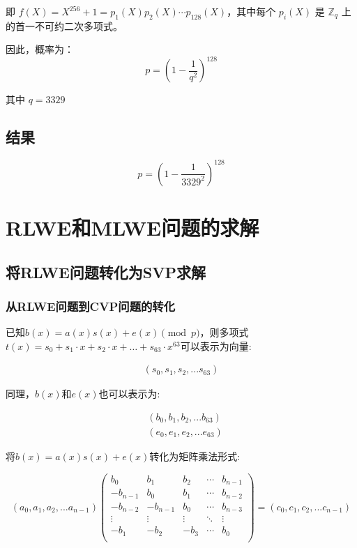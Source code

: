 \documentclass[12pt,a4paper]{article}
\numberwithin{equation}{section}
\begin{document}
即 $f(X) = X^{256} + 1 = p_1(X) p_2(X) \cdots p_{128}(X)$，其中每个 $p_i(X)$ 是 $\mathbb{Z}_q$ 上的首一不可约二次多项式。

因此，概率为：
\begin{equation}
	p = \left(1 - \frac{1}{q^2}\right)^{128}
\end{equation}

其中 $q = 3329$


\subsection{结果}

\begin{equation}
	p = \left(1 - \frac{1}{3329^2}\right)^{128}
\end{equation}


\section{RLWE和MLWE问题的求解}

\subsection{将RLWE问题转化为SVP求解}

\subsubsection{从RLWE问题到CVP问题的转化}

已知$b(x)=a(x)s(x)+e(x) \pmod p$，则多项式$t(x)=s_0+s_1 \cdot x + s_2 \cdot x + \ldots + s_{63} \cdot x^{63}$可以表示为向量:

\begin{align}
	(s_0,s_1,s_2,...s_{63})
\end{align}

同理，$b(x)$和$e(x)$也可以表示为:

\begin{align}
	 & (b_0,b_1,b_2,...b_{63}) \\
	 & (e_0,e_1,e_2,...e_{63})
\end{align}

将$b(x)=a(x)s(x)+e(x)$转化为矩阵乘法形式:

\begin{equation}
	(a_0,a_1,a_2,...a_{n-1})
	\left(
	\begin{smallmatrix}
			b_0      & b_1      & b_2    & \cdots & b_{n-1} \\
			-b_{n-1} & b_0      & b_1    & \cdots & b_{n-2} \\
			-b_{n-2} & -b_{n-1} & b_0    & \cdots & b_{n-3} \\
			\vdots   & \vdots   & \vdots & \ddots & \vdots  \\
			-b_1     & -b_2     & -b_3   & \cdots & b_0     \\
		\end{smallmatrix}
	\right)
	=
	(c_0,c_1,c_2,...c_{n-1})
\end{equation}
\end{document}
